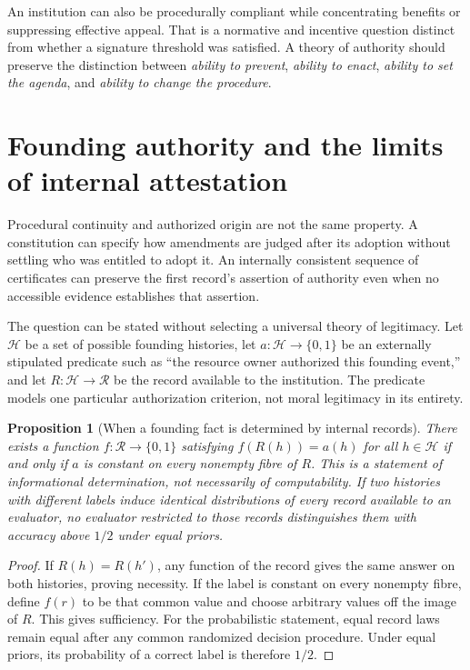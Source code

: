 \documentclass[11pt,letterpaper]{article}
\theoremstyle{plain}
\newtheorem{proposition}{Proposition}[section]
\theoremstyle{definition}
\theoremstyle{remark}
\begin{document}
An institution can also be procedurally compliant while concentrating benefits or suppressing effective appeal. That is a normative and incentive question distinct from whether a signature threshold was satisfied. A theory of authority should preserve the distinction between \emph{ability to prevent}, \emph{ability to enact}, \emph{ability to set the agenda}, and \emph{ability to change the procedure}.

\section{Founding authority and the limits of internal attestation}\label{sec:founding}
Procedural continuity and authorized origin are not the same property. A constitution can specify how amendments are judged after its adoption without settling who was entitled to adopt it. An internally consistent sequence of certificates can preserve the first record's assertion of authority even when no accessible evidence establishes that assertion.

The question can be stated without selecting a universal theory of legitimacy. Let $\mathcal H$ be a set of possible founding histories, let $a:\mathcal H\to\{0,1\}$ be an externally stipulated predicate such as ``the resource owner authorized this founding event,'' and let $R:\mathcal H\to\mathcal R$ be the record available to the institution. The predicate models one particular authorization criterion, not moral legitimacy in its entirety.

\begin{proposition}[When a founding fact is determined by internal records]\label{prop:founding}
There exists a function $f:\mathcal R\to\{0,1\}$ satisfying $f(R(h))=a(h)$ for all $h\in\mathcal H$ if and only if $a$ is constant on every nonempty fibre of $R$. This is a statement of informational determination, not necessarily of computability. If two histories with different labels induce identical distributions of every record available to an evaluator, no evaluator restricted to those records distinguishes them with accuracy above $1/2$ under equal priors.
\end{proposition}
\begin{proof}
If $R(h)=R(h')$, any function of the record gives the same answer on both histories, proving necessity. If the label is constant on every nonempty fibre, define $f(r)$ to be that common value and choose arbitrary values off the image of $R$. This gives sufficiency. For the probabilistic statement, equal record laws remain equal after any common randomized decision procedure. Under equal priors, its probability of a correct label is therefore $1/2$.
\end{proof}
\end{document}

